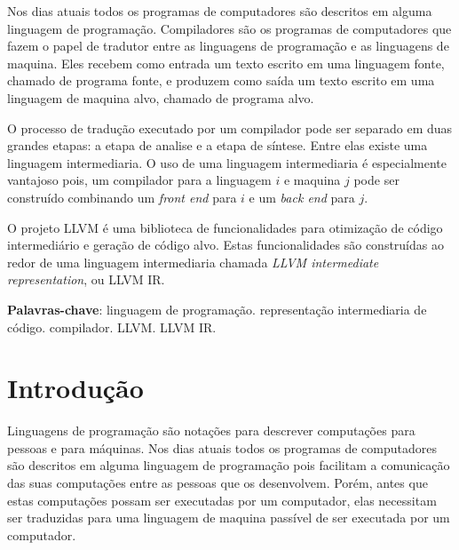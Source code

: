 \documentclass[
  12pt,
  openright,
  twoside,
  a4paper,
  english,
  brazil
]{abntex2}
\begin{document}
\pretextual{}
\hypersetup{pageanchor=false}
\imprimircapa{}
\hypersetup{pageanchor=true}
\imprimirfolhaderosto{}

\begin{folhadeaprovacao}
  
\end{folhadeaprovacao}

\begin{resumo}
Nos dias atuais todos os programas de computadores são descritos em alguma linguagem de programação.
Compiladores são os programas de computadores que fazem o papel de tradutor entre as linguagens de programação e as linguagens de maquina.
Eles recebem como entrada um texto escrito em uma linguagem fonte, chamado de programa fonte, e produzem como saída um texto escrito em uma linguagem de maquina alvo, chamado de programa alvo.

O processo de tradução executado por um compilador pode ser separado em duas grandes etapas: a etapa de analise e a etapa de síntese.
Entre elas existe uma linguagem intermediaria.
O uso de uma linguagem intermediaria é especialmente vantajoso pois, um compilador para a linguagem $i$ e maquina $j$ pode ser construído combinando um \textit{front end} para $i$ e um \textit{back end} para $j$.

O projeto LLVM é uma biblioteca de funcionalidades para otimização de código intermediário e geração de código alvo.
Estas funcionalidades são construídas ao redor de uma linguagem intermediaria chamada \textit{LLVM intermediate representation}, ou LLVM IR\@.

\vspace{\onelineskip}
\noindent
\textbf{Palavras-chave}: linguagem de programação\@. representação intermediaria de código\@. compilador\@. LLVM\@. LLVM IR\@.

\end{resumo}

\begin{KeepFromToc}
  \tableofcontents
\end{KeepFromToc}

\textual{}

\chapter{Introdução}\label{cap:introducao}

Linguagens de programação são notações para descrever computações para pessoas e para máquinas.
Nos dias atuais todos os programas de computadores são descritos em alguma linguagem de programação
pois facilitam a comunicação das suas computações entre as pessoas que os desenvolvem.
Porém, antes que estas computações possam ser executadas por um computador,
elas necessitam ser traduzidas para uma linguagem de maquina passível de ser executada por um computador.
\end{document}
